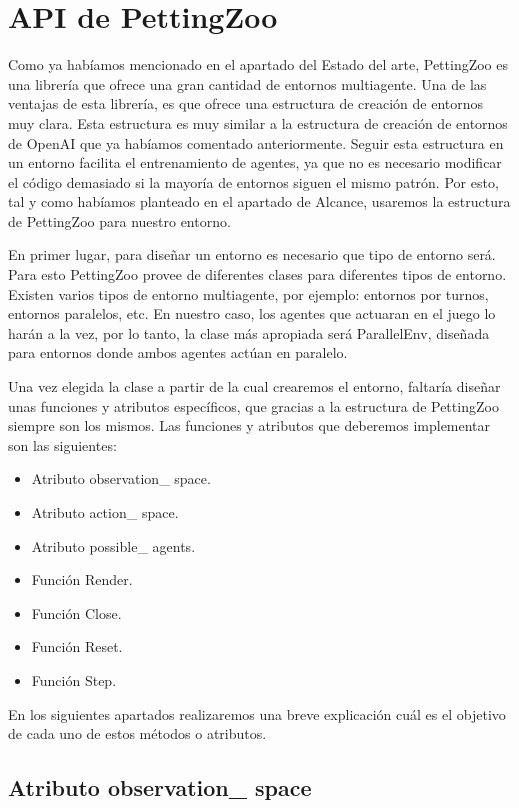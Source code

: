 \section{API de PettingZoo}

Como ya habíamos mencionado en el apartado del Estado del arte, PettingZoo es una librería que ofrece una gran cantidad de entornos multiagente. Una de las ventajas de esta librería, es que ofrece una estructura de creación de entornos muy clara. Esta estructura es muy similar a la estructura de creación de entornos de OpenAI que ya habíamos comentado anteriormente. Seguir esta estructura en un entorno facilita el entrenamiento de agentes, ya que no es necesario modificar el código demasiado si la mayoría de entornos siguen el mismo patrón. Por esto, tal y como habíamos planteado en el apartado de Alcance, usaremos la estructura de PettingZoo para nuestro entorno.

En primer lugar, para diseñar un entorno es necesario que tipo de entorno será. Para esto PettingZoo provee de diferentes clases para diferentes tipos de entorno. Existen varios tipos de entorno multiagente, por ejemplo: entornos por turnos, entornos paralelos, etc. En nuestro caso, los agentes que actuaran en el juego lo harán a la vez, por lo tanto, la clase más apropiada será ParallelEnv, diseñada para entornos donde ambos agentes actúan en paralelo.

Una vez elegida la clase a partir de la cual crearemos el entorno, faltaría diseñar unas funciones y atributos específicos, que gracias a la estructura de PettingZoo siempre son los mismos. Las funciones y atributos que deberemos implementar son las siguientes:

\begin{itemize}
    \item Atributo observation\_ space.
    \item Atributo action\_ space.
    \item Atributo possible\_ agents.
    \item Función Render.
    \item Función Close.
    \item Función Reset.
    \item Función Step.
\end{itemize}

En los siguientes apartados realizaremos una breve explicación cuál es el objetivo de cada uno de estos métodos o atributos.

\subsection*{Atributo observation\_ space}

